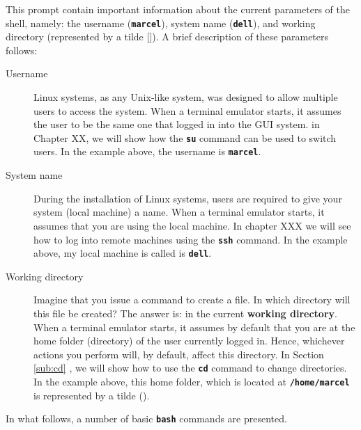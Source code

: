 
This prompt contain important information about the current parameters of the shell, namely: the username (\textbf{\texttt{marcel}}), system name (\textbf{\texttt{dell}}), and working directory (represented by a tilde [\textbf{\texttt{\texttildelow}}]). A brief description of these parameters follows:

\begin{description}
\item [Username] Linux systems, as any Unix-like system, was designed to allow multiple users to access the system. When a terminal emulator starts, it assumes the user to be the same one that logged in into the GUI system. in Chapter XX, we will show how the \textbf{\texttt{su}} command can be used to switch users. In the example above, the username is \textbf{\texttt{marcel}}.

\item[System name] During the installation of Linux systems,  users are required to give your system (local machine) a name. When a terminal emulator starts, it assumes that you are using the local machine. In chapter XXX we will see how to log into remote machines using the \textbf{\texttt{ssh}} command. In the example above, my local machine is called is \textbf{\texttt{dell}}.

\item[Working directory] Imagine that you issue a command to create a file. In which directory will this file be created? The answer is: in the current \textbf{working directory}. When a terminal emulator starts, it assumes by default that you are at the home folder (directory) of the user currently logged in. Hence, whichever actions you perform will, by default, affect this directory. In Section \ref{sub:cd} , we will show how to use the \textbf{\texttt{cd}} command to change directories. In the example above, this home folder, which is located at \textbf{\texttt{/home/marcel}} is represented by a tilde (\textbf{\texttt{\texttildelow}}).
\end{description}

In what follows, a number of basic \textbf{\texttt{bash}} commands are presented.

